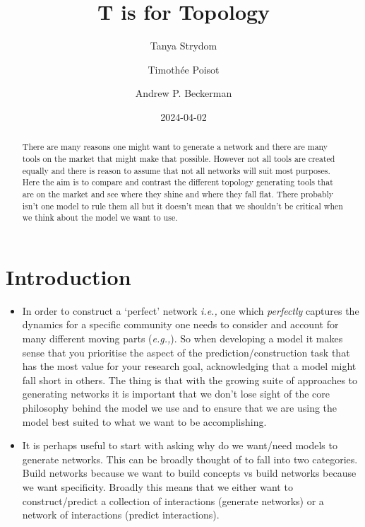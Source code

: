 \documentclass[
  letterpaper,
  DIV=11,
  numbers=noendperiod]{scrartcl}
\title{T is for Topology}
\author{Tanya Strydom \and Timothée Poisot \and Andrew P. Beckerman}
\date{2024-04-02}
\begin{document}
\maketitle
\begin{abstract}
There are many reasons one might want to generate a network and there
are many tools on the market that might make that possible. However not
all tools are created equally and there is reason to assume that not all
networks will suit most purposes. Here the aim is to compare and
contrast the different topology generating tools that are on the market
and see where they shine and where they fall flat. There probably isn't
one model to rule them all but it doesn't mean that we shouldn't be
critical when we think about the model we want to use.
\end{abstract}

\section{Introduction}\label{introduction}

\begin{itemize}
\item
  In order to construct a `perfect' network \emph{i.e.,} one which
  \emph{perfectly} captures the dynamics for a specific community one
  needs to consider and account for many different moving parts
  (\emph{e.g.,}). So when developing a model it makes sense that you
  prioritise the aspect of the prediction/construction task that has the
  most value for your research goal, acknowledging that a model might
  fall short in others. The thing is that with the growing suite of
  approaches to generating networks it is important that we don't lose
  sight of the core philosophy behind the model we use and to ensure
  that we are using the model best suited to what we want to be
  accomplishing.
\item
  It is perhaps useful to start with asking why do we want/need models
  to generate networks. This can be broadly thought of to fall into two
  categories. Build networks because we want to build concepts vs build
  networks because we want specificity. Broadly this means that we
  either want to construct/predict a collection of interactions
  (generate networks) or a network of interactions (predict
  interactions).
\end{itemize}
\end{document}
